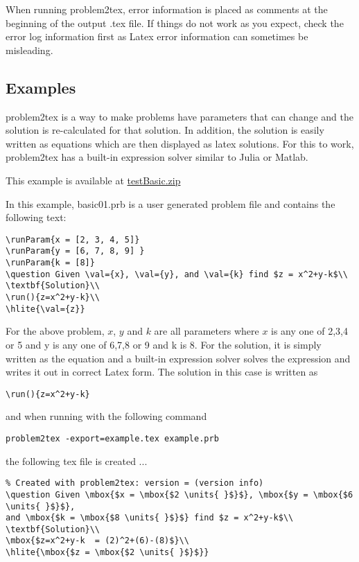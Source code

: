 \documentclass{article}
\newcommand{\hlite}[1]{%
  \colorbox{yellow!50}{#1} }
\newcommand{\units}{\,\mathrm}
\begin{document}
When running problem2tex, error information is placed as comments at the beginning of the output .tex file.  If things do not work as you expect, check the error log information first as Latex error information can sometimes be misleading.

\subsection{Examples}

problem2tex is a way to make problems have parameters that can change and the solution is re-calculated for that solution.  In addition, the solution is easily written as equations which are then displayed as latex solutions.  For this to work, problem2tex has a built-in expression solver similar to Julia or Matlab.   

This example is available at \href{https://www.icewire.ca/examples/testBasic.zip}{testBasic.zip}

In this example, basic01.prb is a user generated problem file and contains the following text:
\begin{lstlisting}
\runParam{x = [2, 3, 4, 5]}
\runParam{y = [6, 7, 8, 9] }
\runParam{k = [8]}
\question Given \val={x}, \val={y}, and \val={k} find $z = x^2+y-k$\\
\textbf{Solution}\\
\run(){z=x^2+y-k}\\ 
\hlite{\val={z}}
\end{lstlisting}

For the above problem, $x$, $y$ and $k$ are all parameters where $x$ is any one of 2,3,4 or 5 and
y is any one of 6,7,8 or 9 and k is 8.  For the solution, it is simply written as the equation and a built-in expression solver solves the expression and writes it out in correct Latex form.  The solution in this case is written as 

\begin{lstlisting}
\run(){z=x^2+y-k}
\end{lstlisting}


and when running with the following command\\
\begin{lstlisting}
problem2tex -export=example.tex example.prb
\end{lstlisting}
the following tex file is created ...
\begin{lstlisting}
% Created with problem2tex: version = (version info)
\question Given \mbox{$x = \mbox{$2 \units{ }$}$}, \mbox{$y = \mbox{$6 \units{ }$}$},
and \mbox{$k = \mbox{$8 \units{ }$}$} find $z = x^2+y-k$\\
\textbf{Solution}\\
\mbox{$z=x^2+y-k  = (2)^2+(6)-(8)$}\\ 
\hlite{\mbox{$z = \mbox{$2 \units{ }$}$}}
\end{lstlisting}
\end{document}
